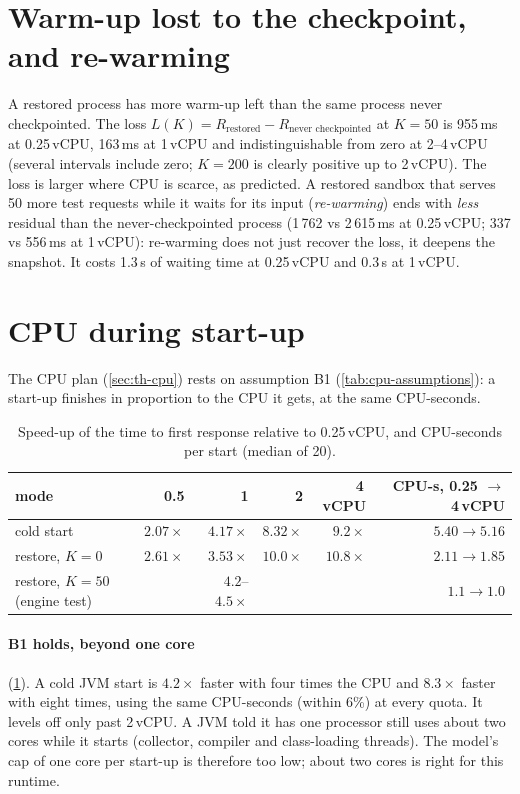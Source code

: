 \section{Warm-up lost to the checkpoint, and re-warming}
\label{sec:m-rewarm}

A restored process has more warm-up left than the same process never checkpointed. The loss
$L(K) = R_{\text{restored}} - R_{\text{never checkpointed}}$ at $K = 50$ is 955\,ms at 0.25\,vCPU,
163\,ms at 1\,vCPU and indistinguishable from zero at 2--4\,vCPU (several intervals include zero;
$K = 200$ is clearly positive up to 2\,vCPU). The loss is larger where CPU is scarce, as predicted.
A restored sandbox that serves 50 more test requests while it waits for its input
(\emph{re-warming}) ends with \emph{less} residual than the never-checkpointed process (1\,762 vs
2\,615\,ms at 0.25\,vCPU; 337 vs 556\,ms at 1\,vCPU): re-warming does not just recover the loss, it
deepens the snapshot. It costs 1.3\,s of waiting time at 0.25\,vCPU and 0.3\,s at 1\,vCPU.

\section{CPU during start-up}
\label{sec:m-cpu}

The CPU plan (\cref{sec:th-cpu}) rests on assumption B1 (\cref{tab:cpu-assumptions}): a start-up
finishes in proportion to the CPU it gets, at the same CPU-seconds.

\begin{table}[htbp]
\centering
\caption{Speed-up of the time to first response relative to 0.25\,vCPU, and CPU-seconds per start
(median of 20).}
\label{tab:m-speedup}
\small
\begin{tabular}{@{}lrrrrr@{}}
\toprule
mode & 0.5 & 1 & 2 & 4\,vCPU & CPU-s, 0.25 $\to$ 4\,vCPU \\
\midrule
cold start & $2.07\times$ & $4.17\times$ & $8.32\times$ & $9.2\times$ & $5.40 \to 5.16$ \\
restore, $K = 0$ & $2.61\times$ & $3.53\times$ & $10.0\times$ & $10.8\times$ & $2.11 \to 1.85$ \\
restore, $K = 50$ (engine test) & & $4.2$--$4.5\times$ & & & $1.1 \to 1.0$ \\
\bottomrule
\end{tabular}
\end{table}

\paragraph{B1 holds, beyond one core} (\cref{tab:m-speedup}). A cold JVM start is $4.2\times$ faster
with four times the CPU and $8.3\times$ faster with eight times, using the same CPU-seconds
(within 6\%) at every quota. It levels off only past 2\,vCPU. A JVM told it has one processor still
uses about two cores while it starts (collector, compiler and class-loading threads). The model's
cap of one core per start-up is therefore too low; about two cores is right for this runtime.

